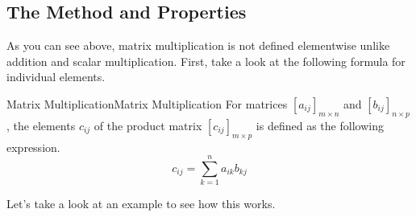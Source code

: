 \documentclass[../main.tex]{subfiles}
\begin{document}
\subsection{The Method and Properties}

As you can see above, matrix multiplication is not defined
elementwise unlike addition and scalar multiplication. First,
take a look at the following formula for individual elements.

\begin{theorem}{Matrix Multiplication}{Matrix Multiplication}
For matrices $[a_{ij}]_{m \times n}$ and $[b_{ij}]_{n \times p}$,
the elements $c_{ij}$ of the product matrix $[c_{ij}]_{m \times p}$
is defined as the following expression.
\[
c_{ij}
= \sum_{k=1}^{n} a_{ik} b_{kj}
\]
\end{theorem}

Let's take a look at an example to see how this works.
\end{document}
